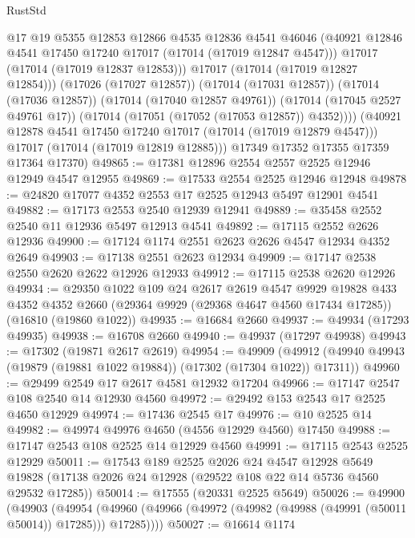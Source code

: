 \begin{lexlean}{RustStd}
\begin{coremodule}
{\begin{coremodule}
{{{{{{{{{{{{{{{{{{{{{{{{{{{{{{{{{{{{{{{{{{{{{{{{{{{{{{{                @17
                @19
                @5355
                @12853
                @12866
                @4535
                @12836
                @4541
                @46046
                (@40921 @12846 @4541 @17450 @17240 @17017 (@17014 (@17019 @12847 @4547)))
                @17017
                (@17014 (@17019 @12837 @12853)))
              @17017
              (@17014 (@17019 @12827 @12854)))
            (@17026 (@17027 @12857))
            (@17014 (@17031 @12857))
            (@17014 (@17036 @12857))
            (@17014 (@17040 @12857 @49761))
            (@17014 (@17045 @2527 @49761 @17))
            (@17014 (@17051 (@17052 (@17053 @12857)) @4352))))
        (@40921 @12878 @4541 @17450 @17240 @17017 (@17014 (@17019 @12879 @4547)))
        @17017
        (@17014 (@17019 @12819 @12885)))
      @17349
      @17352
      @17355
      @17359
      @17364
      @17370)
@49865 := @17381 @12896 @2554 @2557 @2525 @12946 @12949 @4547 @12955
@49869 := @17533 @2554 @2525 @12946 @12948
@49878 := @24820 @17077 @4352 @2553 @17 @2525 @12943 @5497 @12901 @4541
@49882 := @17173 @2553 @2540 @12939 @12941
@49889 := @35458 @2552 @2540 @11 @12936 @5497 @12913 @4541
@49892 := @17115 @2552 @2626 @12936
@49900 := @17124 @1174 @2551 @2623 @2626 @4547 @12934 @4352 @2649
@49903 := @17138 @2551 @2623 @12934
@49909 := @17147 @2538 @2550 @2620 @2622 @12926 @12933
@49912 := @17115 @2538 @2620 @12926
@49934 := @29350
    @1022
    @109
    @24
    @2617
    @2619
    @4547
    @9929
    @19828
    @433
    @4352
    @4352
    @2660
    (@29364 @9929 (@29368 @4647 @4560 @17434 @17285))
    (@16810 (@19860 @1022))
@49935 := @16684 @2660
@49937 := @49934 (@17293 @49935)
@49938 := @16708 @2660
@49940 := @49937 (@17297 @49938)
@49943 := @17302 (@19871 @2617 @2619)
@49954 := @49909
    (@49912 (@49940 @49943 (@19879 (@19881 @1022 @19884)) (@17302 (@17304 @1022)) @17311))
@49960 := @29499 @2549 @17 @2617 @4581 @12932 @17204
@49966 := @17147 @2547 @108 @2540 @14 @12930 @4560
@49972 := @29492 @153 @2543 @17 @2525 @4650 @12929
@49974 := @17436 @2545 @17
@49976 := @10 @2525 @14
@49982 := @49974 @49976 @4650 (@4556 @12929 @4560) @17450
@49988 := @17147 @2543 @108 @2525 @14 @12929 @4560
@49991 := @17115 @2543 @2525 @12929
@50011 := @17543
    @189
    @2525
    @2026
    @24
    @4547
    @12928
    @5649
    @19828
    (@17138 @2026 @24 @12928 (@29522 @108 @22 @14 @5736 @4560 @29532 @17285))
@50014 := @17555 (@20331 @2525 @5649)
@50026 := @49900
    (@49903
      (@49954 (@49960 (@49966 (@49972 (@49982 (@49988 (@49991 (@50011 @50014)) @17285))) @17285))))
@50027 := @16614 @1174
}}}}}}}}}}}}}}}}}}}}}}}}}}}}}}}}}}}}}}}}}}}}}}}}}}}}}}}
\end{coremodule}}
\end{coremodule}
\end{lexlean}

